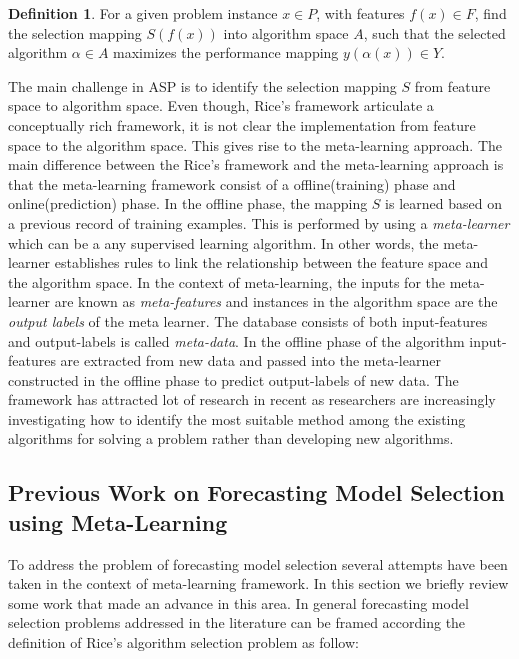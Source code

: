 \documentclass[11pt,a4paper,]{article}
\theoremstyle{definition}
\newtheorem{definition}{Definition}[section]
\theoremstyle{definition}
\theoremstyle{definition}
\theoremstyle{remark}
\begin{document}
\begin{definition}
\label{def2}
For a given problem instance $x \in P$, with features $f(x) \in F$, find the selection mapping $S(f(x))$ into algorithm space $A$, such that the selected algorithm $\alpha \in A$ maximizes the performance mapping $y(\alpha(x)) \in Y$.
\end{definition}

The main challenge in ASP is to identify the selection mapping \(S\)
from feature space to algorithm space. Even though, Rice's framework
articulate a conceptually rich framework, it is not clear the
implementation from feature space to the algorithm space. This gives
rise to the meta-learning approach. The main difference between the
Rice's framework and the meta-learning approach is that the
meta-learning framework consist of a offline(training) phase and
online(prediction) phase. In the offline phase, the mapping \(S\) is
learned based on a previous record of training examples. This is
performed by using a \emph{meta-learner} which can be a any supervised
learning algorithm. In other words, the meta-learner establishes rules
to link the relationship between the feature space and the algorithm
space. In the context of meta-learning, the inputs for the meta-learner
are known as \emph{meta-features} and instances in the algorithm space
are the \emph{output labels} of the meta learner. The database consists
of both input-features and output-labels is called \emph{meta-data}. In
the offline phase of the algorithm input-features are extracted from new
data and passed into the meta-learner constructed in the offline phase
to predict output-labels of new data. The framework has attracted lot of
research in recent as researchers are increasingly investigating how to
identify the most suitable method among the existing algorithms for
solving a problem rather than developing new algorithms.

\subsection{Previous Work on Forecasting Model Selection using
Meta-Learning}\label{previous-work-on-forecasting-model-selection-using-meta-learning}

To address the problem of forecasting model selection several attempts
have been taken in the context of meta-learning framework. In this
section we briefly review some work that made an advance in this area.
In general forecasting model selection problems addressed in the
literature can be framed according the definition of Rice's algorithm
selection problem as follow:
\end{document}
